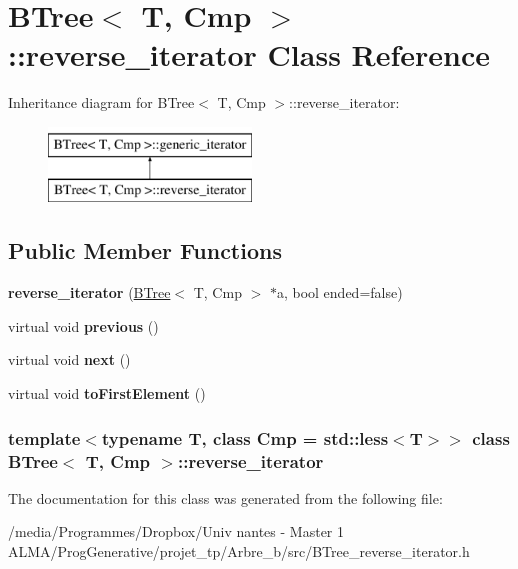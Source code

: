 \hypertarget{classBTree_1_1reverse__iterator}{
\section{BTree$<$ T, Cmp $>$::reverse\_\-iterator Class Reference}
\label{classBTree_1_1reverse__iterator}
}
Inheritance diagram for BTree$<$ T, Cmp $>$::reverse\_\-iterator:\begin{figure}[H]
\begin{center}
\leavevmode
\includegraphics[height=2.000000cm]{classBTree_1_1reverse__iterator}
\end{center}
\end{figure}
\subsection*{Public Member Functions}
\begin{DoxyCompactItemize}
\item 
\hypertarget{classBTree_1_1reverse__iterator_ae65bc354e96e4f6250a01465a302f970}{
{\bfseries reverse\_\-iterator} (\hyperlink{classBTree}{BTree}$<$ T, Cmp $>$ $\ast$a, bool ended=false)}
\label{classBTree_1_1reverse__iterator_ae65bc354e96e4f6250a01465a302f970}

\item 
\hypertarget{classBTree_1_1reverse__iterator_a3228eb5621bd30d05d0c1cb47016d617}{
virtual void {\bfseries previous} ()}
\label{classBTree_1_1reverse__iterator_a3228eb5621bd30d05d0c1cb47016d617}

\item 
\hypertarget{classBTree_1_1reverse__iterator_a979f0b8c1911cf1d1718a87b4e23e669}{
virtual void {\bfseries next} ()}
\label{classBTree_1_1reverse__iterator_a979f0b8c1911cf1d1718a87b4e23e669}

\item 
\hypertarget{classBTree_1_1reverse__iterator_a83b4140610bbb0bab9eb545462dbf28b}{
virtual void {\bfseries toFirstElement} ()}
\label{classBTree_1_1reverse__iterator_a83b4140610bbb0bab9eb545462dbf28b}

\end{DoxyCompactItemize}
\subsubsection*{template$<$typename T, class Cmp = std::less$<$T$>$$>$ class BTree$<$ T, Cmp $>$::reverse\_\-iterator}



The documentation for this class was generated from the following file:\begin{DoxyCompactItemize}
\item 
/media/Programmes/Dropbox/Univ nantes -\/ Master 1 ALMA/ProgGenerative/projet\_\-tp/Arbre\_\-b/src/BTree\_\-reverse\_\-iterator.h\end{DoxyCompactItemize}
